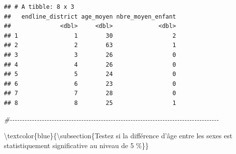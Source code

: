 \documentclass[
]{article}
\newenvironment{Shaded}{\begin{snugshade}}{\end{snugshade}}
\newcommand{\CommentTok}[1]{\textcolor[rgb]{0.56,0.35,0.01}{\textit{#1}}}
\begin{document}
\begin{verbatim}
## # A tibble: 8 x 3
##   endline_district age_moyen nbre_moyen_enfant
##              <dbl>     <dbl>             <dbl>
## 1                1        30                 2
## 2                2        63                 1
## 3                3        26                 0
## 4                4        26                 0
## 5                5        24                 0
## 6                6        23                 0
## 7                7        28                 0
## 8                8        25                 1
\end{verbatim}

\begin{Shaded}
\begin{Highlighting}[]
\CommentTok{\#{-}{-}{-}{-}{-}{-}{-}{-}{-}{-}{-}{-}{-}{-}{-}{-}{-}{-}{-}{-}{-}{-}{-}{-}{-}{-}{-}{-}{-}{-}{-}{-}{-}{-}{-}{-}{-}{-}{-}{-}{-}{-}{-}{-}{-}{-}{-}{-}{-}{-}{-}{-}{-}{-}{-}{-}{-}{-}{-}{-}{-}{-}{-}{-}{-}{-}{-}{-}{-}{-}{-}{-}{-}{-}{-}{-}{-}{-}{-}{-}{-}{-}{-}{-}{-}}
\end{Highlighting}
\end{Shaded}

\textbackslash textcolor\{blue\}\{\textbackslash subsection\{Testez si
la différence d'âge entre les sexes est statistiquement significative au
niveau de 5 \%\}\}
\end{document}
